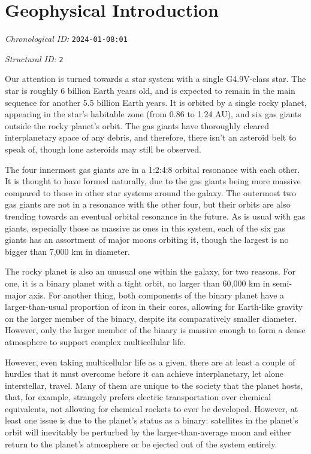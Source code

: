 \section{Geophysical Introduction}
\emph{Chronological ID:} \texttt{2024-01-08:01}

\emph{Structural ID:} \texttt{2}

Our attention is turned towards a star system with a single G4.9V-class star. The star is roughly 6 billion Earth years old, and is expected to remain in the main sequence for another 5.5 billion Earth years. It is orbited by a single rocky planet, appearing in the star's habitable zone (from 0.86 to 1.24 AU), and six gas giants outside the rocky planet's orbit. The gas giants have thoroughly cleared interplanetary space of any debris, and therefore, there isn't an asteroid belt to speak of, though lone asteroids may still be observed.

The four innermost gas giants are in a 1:2:4:8 orbital resonance with each other. It is thought to have formed naturally, due to the gas giants being more massive compared to those in other star systems around the galaxy. The outermost two gas giants are not in a resonance with the other four, but their orbits are also trending towards an eventual orbital resonance in the future. As is usual with gas giants, especially those as massive as ones in this system, each of the six gas giants has an assortment of major moons orbiting it, though the largest is no bigger than 7,000 km in diameter.

The rocky planet is also an unusual one within the galaxy, for two reasons. For one, it is a binary planet with a tight orbit, no larger than 60,000 km in semi-major axis. For another thing, both components of the binary planet have a larger-than-usual proportion of iron in their cores, allowing for Earth-like gravity on the larger member of the binary, despite its comparatively smaller diameter. However, only the larger member of the binary is massive enough to form a dense atmosphere to support complex multicellular life.

However, even taking multicellular life as a given, there are at least a couple of hurdles that it must overcome before it can achieve interplanetary, let alone interstellar, travel. Many of them are unique to the society that the planet hosts, that, for example, strangely prefers electric transportation over chemical equivalents, not allowing for chemical rockets to ever be developed. However, at least one issue is due to the planet's status as a binary: satellites in the planet's orbit will inevitably be perturbed by the larger-than-average moon and either return to the planet's atmosphere or be ejected out of the system entirely.
\newpage
